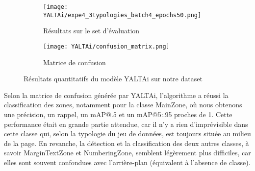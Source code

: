 \documentclass[a4paper, twoside, 12pt]{book}
\begin{document}
\begin{figure}[H]
  \centering
  \begin{subfigure}[b]{15cm}
    \texttt{[image: YALTAi/expe4\_3typologies\_batch4\_epochs50.png]}
    \caption{Résultats sur le set d'évaluation}
    \label{fig:subfig1}
  \end{subfigure}
  \vspace{0.5cm}
  
  \begin{subfigure}[b]{15cm}
    \texttt{[image: YALTAi/confusion\_matrix.png]}
    \caption{Matrice de confusion}
    \label{fig:subfig2}
  \end{subfigure}
  \caption{Résultats quantitatifs du modèle YALTAi sur notre dataset}
  \label{fig:yaltairesults}
\end{figure}

Selon la matrice de confusion générée par YALTAi, l'algorithme a réussi la classification des zones, notamment pour la classe MainZone, où nous obtenons une précision, un rappel, un mAP@.5 et un mAP@5:.95 proches de 1. Cette performance était en grande partie attendue, car il n'y a rien d'imprévisible dans cette classe qui, selon la typologie du jeu de données, est toujours située au milieu de la page. En revanche, la détection et la classification des deux autres classes, à savoir MarginTextZone et NumberingZone, semblent légèrement plus difficiles, car elles sont souvent confondues avec l'arrière-plan (équivalent à l'absence de classe).\\
\end{document}
